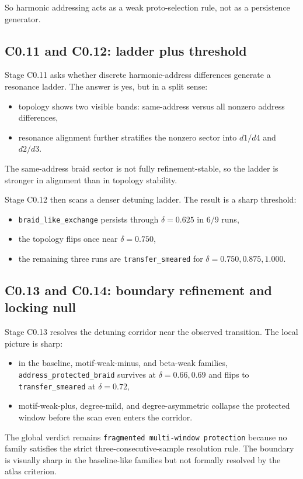 \documentclass[11pt]{article}
\begin{document}
So harmonic addressing acts as a weak proto-selection rule, not as a persistence generator.

\subsection{C0.11 and C0.12: ladder plus threshold}

Stage C0.11 asks whether discrete harmonic-address differences generate a resonance ladder. The answer is yes, but in a split sense:
\begin{itemize}
\item topology shows two visible bands: same-address versus all nonzero address differences,
\item resonance alignment further stratifies the nonzero sector into $d1/d4$ and $d2/d3$.
\end{itemize}
The same-address braid sector is not fully refinement-stable, so the ladder is stronger in alignment than in topology stability.

Stage C0.12 then scans a denser detuning ladder. The result is a sharp threshold:
\begin{itemize}
\item \texttt{braid\_like\_exchange} persists through $\delta = 0.625$ in $6/9$ runs,
\item the topology flips once near $\delta = 0.750$,
\item the remaining three runs are \texttt{transfer\_smeared} for $\delta = 0.750, 0.875, 1.000$.
\end{itemize}

\subsection{C0.13 and C0.14: boundary refinement and locking null}

Stage C0.13 resolves the detuning corridor near the observed transition. The local picture is sharp:
\begin{itemize}
\item in the baseline, motif-weak-minus, and beta-weak families, \texttt{address\_protected\_braid} survives at $\delta = 0.66, 0.69$ and flips to \texttt{transfer\_smeared} at $\delta = 0.72$,
\item motif-weak-plus, degree-mild, and degree-asymmetric collapse the protected window before the scan even enters the corridor.
\end{itemize}

The global verdict remains \texttt{fragmented multi-window protection} because no family satisfies the strict three-consecutive-sample resolution rule. The boundary is visually sharp in the baseline-like families but not formally resolved by the atlas criterion.
\end{document}

